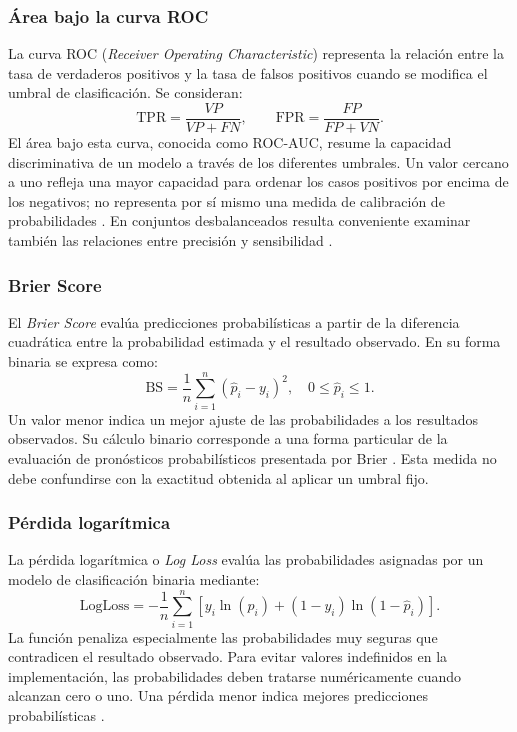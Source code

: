 \subsubsection{Área bajo la curva ROC}
La curva ROC (\textit{Receiver Operating Characteristic}) representa la relación entre la tasa de verdaderos positivos y la tasa de falsos positivos cuando se modifica el umbral de clasificación. Se consideran:
\begin{equation}
\mathrm{TPR}=\frac{VP}{VP+FN},
\qquad
\mathrm{FPR}=\frac{FP}{FP+VN}.
\end{equation}
El área bajo esta curva, conocida como ROC-AUC, resume la capacidad discriminativa de un modelo a través de los diferentes umbrales. Un valor cercano a uno refleja una mayor capacidad para ordenar los casos positivos por encima de los negativos; no representa por sí mismo una medida de calibración de probabilidades \cite{fawcett2006roc}. En conjuntos desbalanceados resulta conveniente examinar también las relaciones entre precisión y sensibilidad \cite{saito2015precisionrecall}.

\subsubsection{Brier Score}
El \textit{Brier Score} evalúa predicciones probabilísticas a partir de la diferencia cuadrática entre la probabilidad estimada y el resultado observado. En su forma binaria se expresa como:
\begin{equation}
\mathrm{BS}=\frac{1}{n}\sum_{i=1}^{n}(\hat p_i-y_i)^2,
\quad 0\leq \hat p_i\leq 1.
\end{equation}
Un valor menor indica un mejor ajuste de las probabilidades a los resultados observados. Su cálculo binario corresponde a una forma particular de la evaluación de pronósticos probabilísticos presentada por Brier \cite{brier1950verification}. Esta medida no debe confundirse con la exactitud obtenida al aplicar un umbral fijo.

\subsubsection{Pérdida logarítmica}
La pérdida logarítmica o \textit{Log Loss} evalúa las probabilidades asignadas por un modelo de clasificación binaria mediante:
\begin{equation}
\mathrm{LogLoss}=-\frac{1}{n}\sum_{i=1}^{n}
\left[y_i\ln(\hat p_i)+(1-y_i)\ln(1-\hat p_i)\right].
\end{equation}
La función penaliza especialmente las probabilidades muy seguras que contradicen el resultado observado. Para evitar valores indefinidos en la implementación, las probabilidades deben tratarse numéricamente cuando alcanzan cero o uno. Una pérdida menor indica mejores predicciones probabilísticas \cite{bishop2006pattern,hastie2009elements}.

